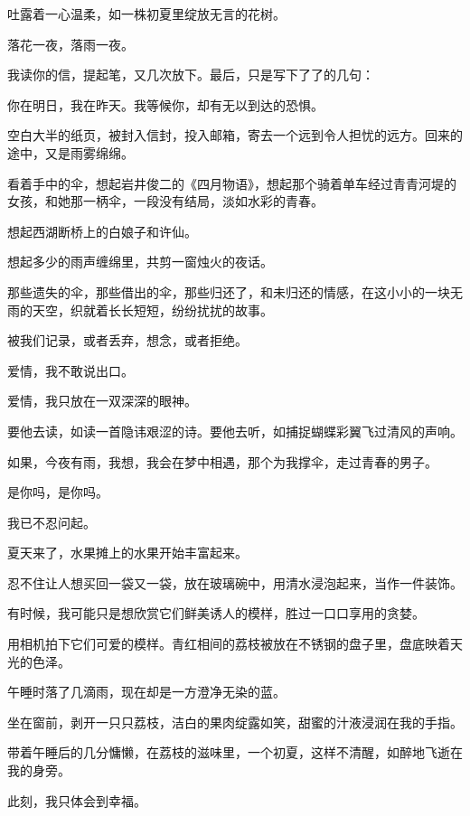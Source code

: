 \documentclass[12pt,a4paper]{article}
\def\blankrev{\vspace{1ex}}									%
\begin{document}
		吐露着一心温柔，如一株初夏里绽放无言的花树。\par
		落花一夜，落雨一夜。\par
		我读你的信，提起笔，又几次放下。最后，只是写下了了的几句：

		你在明日，我在昨天。我等候你，却有无以到达的恐惧。

		空白大半的纸页，被封入信封，投入邮箱，寄去一个远到令人担忧的远方。回来的途中，又是雨雾绵绵。\par
		看着手中的伞，想起岩井俊二的《四月物语》，想起那个骑着单车经过青青河堤的女孩，和她那一柄伞，一段没有结局，淡如水彩的青春。\par
		想起西湖断桥上的白娘子和许仙。\par
		想起多少的雨声缠绵里，共剪一窗烛火的夜话。\par
		那些遗失的伞，那些借出的伞，那些归还了，和未归还的情感，在这小小的一块无雨的天空，织就着长长短短，纷纷扰扰的故事。\par
		被我们记录，或者丢弃，想念，或者拒绝。

		爱情，我不敢说出口。\par
		爱情，我只放在一双深深的眼神。\par
		要他去读，如读一首隐讳艰涩的诗。要他去听，如捕捉蝴蝶彩翼飞过清风的声响。

		如果，今夜有雨，我想，我会在梦中相遇，那个为我撑伞，走过青春的男子。\par
		是你吗，是你吗。\par
		我已不忍问起。

	\endwriting



		夏天来了，水果摊上的水果开始丰富起来。\par
		忍不住让人想买回一袋又一袋，放在玻璃碗中，用清水浸泡起来，当作一件装饰。\par
		有时候，我可能只是想欣赏它们鲜美诱人的模样，胜过一口口享用的贪婪。

		\blankrev
		用相机拍下它们可爱的模样。青红相间的荔枝被放在不锈钢的盘子里，盘底映着天光的色泽。\par
		午睡时落了几滴雨，现在却是一方澄净无染的蓝。\par
		坐在窗前，剥开一只只荔枝，洁白的果肉绽露如笑，甜蜜的汁液浸润在我的手指。\par
		带着午睡后的几分慵懒，在荔枝的滋味里，一个初夏，这样不清醒，如醉地飞逝在我的身旁。\par
		此刻，我只体会到幸福。
\end{document}
